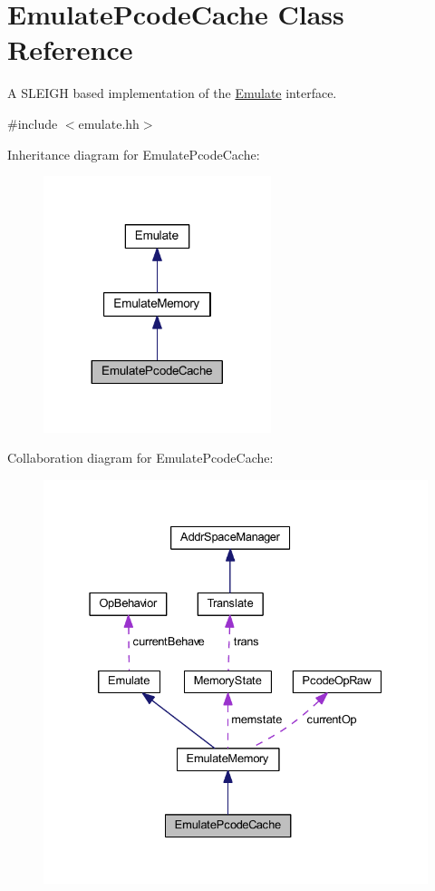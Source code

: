 \hypertarget{class_emulate_pcode_cache}{}\section{Emulate\+Pcode\+Cache Class Reference}
\label{class_emulate_pcode_cache}


A S\+L\+E\+I\+GH based implementation of the \mbox{\hyperlink{class_emulate}{Emulate}} interface.  




{\ttfamily \#include $<$emulate.\+hh$>$}



Inheritance diagram for Emulate\+Pcode\+Cache\+:
\nopagebreak
\begin{figure}[H]
\begin{center}
\leavevmode
\includegraphics[width=188pt]{class_emulate_pcode_cache__inherit__graph}
\end{center}
\end{figure}


Collaboration diagram for Emulate\+Pcode\+Cache\+:
\nopagebreak
\begin{figure}[H]
\begin{center}
\leavevmode
\includegraphics[width=331pt]{class_emulate_pcode_cache__coll__graph}
\end{center}
\end{figure}
